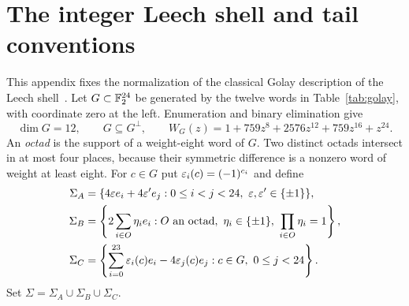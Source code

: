 \section{The integer Leech shell and tail conventions}\label{app:leech}

This appendix fixes the normalization of the classical Golay
description of the Leech shell~\cite{conway1999sphere}. Let
$G\subset\mathbb F_2^{24}$ be generated by the twelve words in
Table~\ref{tab:golay}, with coordinate zero at the left. Enumeration
and binary elimination give
\begin{equation}\label{eq:golay}
 \dim G=12,\qquad G\subseteq G^\perp,\qquad
 W_G(z)=1+759z^8+2576z^{12}+759z^{16}+z^{24}.
\end{equation}
An \emph{octad} is the support of a weight-eight word of $G$.
Two distinct octads intersect in at most four places, because their
symmetric difference is a nonzero word of weight at least eight.
For $c\in G$ put $\varepsilon_i(c)=(-1)^{c_i}$ and define
\begin{align}
 \Sigma_A&=\{4\eps e_i+4\eps'e_j:0\le i<j<24,\ \eps,\eps'\in\{\pm1\}\},
 \label{eq:shell-A}\\
 \Sigma_B&=\left\{2\sum_{i\in O}\eta_i e_i:
       O\text{ an octad},\ \eta_i\in\{\pm1\},\ \prod_{i\in O}\eta_i=1\right\},
 \label{eq:shell-B}\\
 \Sigma_C&=\left\{\sum_{i=0}^{23}\eps_i(c)e_i-4\eps_j(c)e_j:
                         c\in G,\ 0\le j<24\right\}.
 \label{eq:shell-C}
\end{align}
Set $\Sigma=\Sigma_A\cup\Sigma_B\cup\Sigma_C$.

